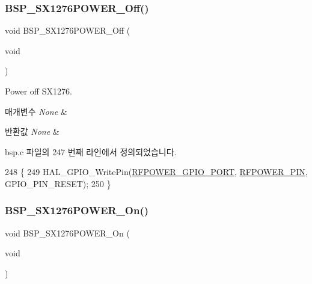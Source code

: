 \subsubsection{\texorpdfstring{B\+S\+P\+\_\+\+S\+X1276\+P\+O\+W\+E\+R\+\_\+\+Off()}{BSP\_SX1276POWER\_Off()}}
{\footnotesize\ttfamily void B\+S\+P\+\_\+\+S\+X1276\+P\+O\+W\+E\+R\+\_\+\+Off (\begin{DoxyParamCaption}\item[{void}]{ }\end{DoxyParamCaption})}



Power off S\+X1276. 


\begin{DoxyParams}{매개변수}
{\em None} & \\
\hline
\end{DoxyParams}

\begin{DoxyRetVals}{반환값}
{\em None} & \\
\hline
\end{DoxyRetVals}


bsp.\+c 파일의 247 번째 라인에서 정의되었습니다.


\begin{DoxyCode}
248 \{
249   HAL\_GPIO\_WritePin(\mbox{\hyperlink{_lory_s_d_k__hw__conf_8h_a8f8e11c368ec33b36ed1ba4d84bdc555}{RFPOWER\_GPIO\_PORT}}, \mbox{\hyperlink{_lory_s_d_k__hw__conf_8h_a15fab54516f17b1b5a79b1fbfc397d79}{RFPOWER\_PIN}}, GPIO\_PIN\_RESET); 
250 \}
\end{DoxyCode}
\mbox{\label{group___docking_station___r_f___power___functions_gaef6814f684bbf7fa47adda1abc4c1129}} 
\subsubsection{\texorpdfstring{B\+S\+P\+\_\+\+S\+X1276\+P\+O\+W\+E\+R\+\_\+\+On()}{BSP\_SX1276POWER\_On()}}
{\footnotesize\ttfamily void B\+S\+P\+\_\+\+S\+X1276\+P\+O\+W\+E\+R\+\_\+\+On (\begin{DoxyParamCaption}\item[{void}]{ }\end{DoxyParamCaption})}




